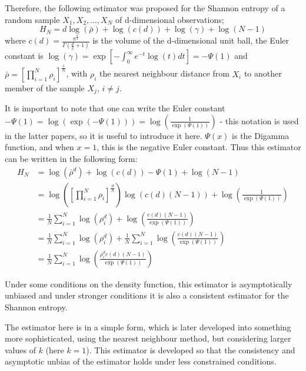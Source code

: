 \documentclass[12pt]{report}
\begin{document}
Therefore, the following estimator was proposed for the Shannon entropy of a random sample $X_{1}, X_{2}, ..., X_{N}$ of d-dimensional observations;
\begin{equation}
H_{N} = d \log(\bar{\rho } ) + \log (c(d)) + \log (\gamma) + \log (N-1)
\end{equation}
where $c(d) = \frac{\pi^{\frac{d}{2}}}{\Gamma ( \frac{d}{2} + 1 )}$ is the volume of the d-dimensional unit ball, the Euler constant is $\log (\gamma) = \exp \left[ - \int_{0}^{\infty} e^{-t} \log(t) dt \right] = -\Psi(1)$ and $\bar{\rho} = \left[ \prod_{i=1}^{N} \rho_{i} \right]^{\frac{1}{N}}$, with $\rho_{i}$ the nearest neighbour distance from $X_{i}$ to another member of the sample $X_{j}$, $i \neq j$. 

It is important to note that one can write the Euler constant $-\Psi(1) = \log (\exp(-\Psi(1))) = \log (\frac{1}{\exp(\Psi(1))})$ - this notation is used in the latter papers, so it is useful to introduce it here. $\Psi(x)$ is the Digamma function, and when $x=1$, this is the negative Euler constant. Thus this estimator can be written in the following form:
\begin{align}
H_{N} &= \log(\bar{\rho}^{d} ) + \log (c(d)) - \Psi(1)  + \log (N-1) \nonumber \\
&= \log \left( \left[ \prod_{i=1}^{N} \rho_{i} \right]^{\frac{d}{N}} \right) \log( c(d) (N-1)) + \log \left(\frac{1}{\exp(\Psi(1))}\right) \nonumber \\
&= \frac{1}{N} \sum_{i=1}^{N} \log( \rho_{i}^{d} ) + \log \left( \frac{c(d) (N-1)}{ \exp(\Psi(1))} \right) \nonumber \\
&= \frac{1}{N} \sum_{i=1}^{N}\log(\rho_{i}^{d}) + \frac{1}{N} \sum_{i=1}^{N} \log \left( \frac{c(d) (N-1)}{\exp(\Psi(1))}\right) \nonumber \\
&= \frac{1}{N} \sum_{i=1}^{N} \log \left( \frac{\rho_{i}^{d} c(d) (N-1)}{\exp(\Psi(1))}\right) \label{Est_k=1}
\end{align}

Under some conditions on the density function, this estimator is asymptotically unbiased and under stronger conditions it is also a consistent estimator for the Shannon entropy. 

The estimator here is in a simple form, which is later developed into something more sophisticated, using the nearest neighbour method, but considering larger values of $k$ (here $k=1$). This estimator is developed so that the consistency and asymptotic unbias of the estimator holds under less constrained conditions.
\end{document}
